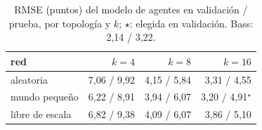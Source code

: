 \begin{table}[htb]
\centering
\caption{RMSE (puntos) del modelo de agentes en validación / prueba, por topología y $k$; $\star$: elegida en validación. Bass: 2,14 / 3,22.}
\label{tab:calibracion}
\small
\setlength{\tabcolsep}{4pt}
\begin{tabular}{lrrr}
\toprule
red & $k=4$ & $k=8$ & $k=16$ \\
\midrule
aleatoria & 7,06 / 9,92 & 4,15 / 5,84 & 3,31 / 4,55 \\
mundo pequeño & 6,22 / 8,91 & 3,94 / 6,07 & 3,20 / 4,91$^\star$ \\
libre de escala & 6,82 / 9,38 & 4,09 / 6,07 & 3,86 / 5,10 \\
\bottomrule
\end{tabular}
\end{table}
